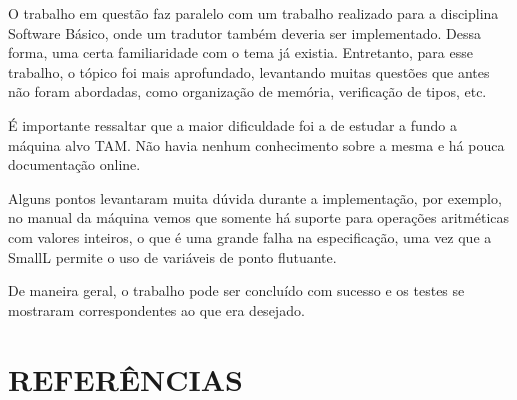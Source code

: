 \documentclass[12pt]{article}
\begin{document}
O trabalho em questão faz paralelo com um trabalho realizado para a disciplina Software Básico, onde um tradutor
também deveria ser implementado. Dessa forma, uma certa familiaridade com o tema já existia. Entretanto, para esse
trabalho, o tópico foi mais aprofundado, levantando muitas questões que antes não foram abordadas, como organização
de memória, verificação de tipos, etc.

É importante ressaltar que a maior dificuldade foi a de estudar a fundo a máquina alvo TAM. Não havia nenhum conhecimento
sobre a mesma e há pouca documentação online.

Alguns pontos levantaram muita dúvida durante a implementação, por exemplo, no manual da máquina vemos que somente 
há suporte para operações aritméticas com valores inteiros, o que é uma grande falha na especificação, uma vez que a SmallL
permite o uso de variáveis de ponto flutuante. 

De maneira geral, o trabalho pode ser concluído com sucesso e os testes se mostraram correspondentes ao que era desejado.

\section{REFERÊNCIAS}



\end{document}
